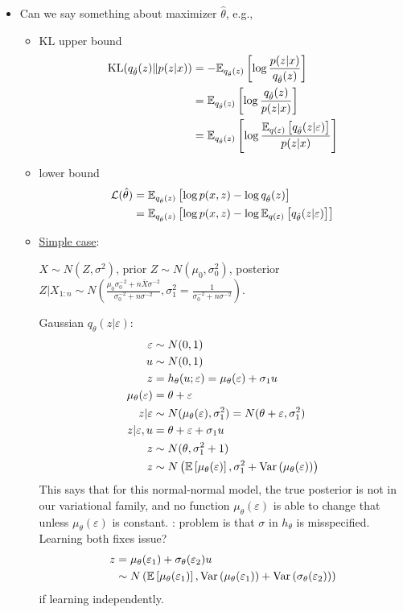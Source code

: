 \documentclass[10pt]{article}
\begin{document}
\begin{itemize}

\item
Can we say something about \elbo maximizer $\hat\theta$, e.g.,
\begin{itemize}
\item
KL upper bound
\begin{align*}
\text{KL}(q_{\hat\theta}(z)\|p(z|x)) &= -\mathbb{E}_{q_{\hat\theta}(z)}\left[\log\frac{p(z|x)}{q_{\hat\theta}(z)}\right] \\
&= \mathbb{E}_{q_{\hat\theta}(z)}\left[\log\frac{q_{\hat\theta}(z)}{p(z|x)}\right] \\
&= \mathbb{E}_{q_{\hat\theta}(z)}\left[\log\frac{\mathbb{E}_{q(\varepsilon)}\left[q_{\hat\theta}(z|\varepsilon)\right]}{p(z|x)}\right]
\end{align*}
\item
\elbo lower bound
\begin{align*}
\mathcal{L}(\hat\theta) &= \mathbb{E}_{q_{\hat\theta}(z)}\left[\log p(x,z) - \log q_{\hat\theta}(z)\right] \\
&= \mathbb{E}_{q_{\hat\theta}(z)}\left[\log p(x,z) - \log \mathbb{E}_{q(\varepsilon)}\left[q_{\hat\theta}(z|\varepsilon)\right]\right]
\end{align*}
\item
\href{https://stats.stackexchange.com/questions/308838/marginal-likelihood-derivation-for-normal-likelihood-and-prior}{Simple case}:

$X\sim N(Z,\sigma^2)$, prior $Z\sim N(\mu_0,\sigma^2_0)$, posterior $Z|X_{1:n}\sim N\left(\frac{\mu_0\sigma_0^{-2}+n\bar{X}\sigma^{-2}}{\sigma_0^{-2}+n\sigma^{-2}}, \sigma_1^2=\frac{1}{\sigma_0^{-2}+n\sigma^{-2}}\right)$.

Gaussian $q_\theta(z|\varepsilon)$:
\begin{align*}
\varepsilon &\sim N(0,1) \\
u &\sim N(0,1) \\
z &= h_\theta(u;\varepsilon) = \mu_\theta(\varepsilon) + \sigma_1u \\
\mu_\theta(\varepsilon) &= \theta + \varepsilon \\
z|\varepsilon &\sim N(\mu_\theta(\varepsilon), \sigma_1^2) = N(\theta + \varepsilon, \sigma_1^2) \\
z|\varepsilon,u &= \theta + \varepsilon + \sigma_1u \\
z &\sim N(\theta, \sigma_1^2+1) \\
z &\sim N\left(\mathbb{E}\left[\mu_\theta(\varepsilon)\right], \sigma_1^2+\mathrm{Var}\left(\mu_\theta(\varepsilon)\right)\right)
\end{align*}
This says that for this normal-normal model, the true posterior is not in our variational family, and no function $\mu_\theta(\varepsilon)$ is able to change that unless $\mu_\theta(\varepsilon)$ is constant. \todo: problem is that $\sigma$ in $h_\theta$ is misspecified. Learning both fixes issue?
\begin{align*}
z &= \mu_\theta(\varepsilon_1) + \sigma_\theta(\varepsilon_2)u \\
&\sim N\left(\mathbb{E}\left[\mu_\theta(\varepsilon_1)\right], \mathrm{Var}\left(\mu_\theta(\varepsilon_1)\right) + \mathrm{Var}\left(\sigma_\theta(\varepsilon_2)\right)\right)
\end{align*}
if learning independently.


\end{itemize}
\end{itemize}
\end{document}
